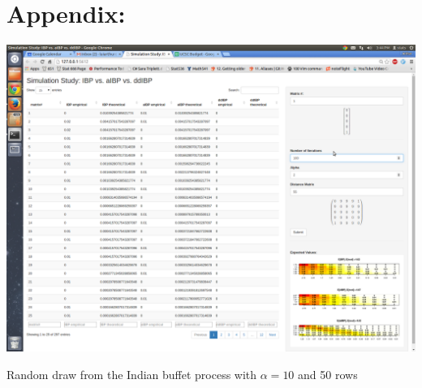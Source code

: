 \chapter{Appendix:}
\beginmyfig
  \vspace{-15mm}
  \vspace{-10mm}
  \includegraphics{images/shiny.png}
  \caption{Random draw from the Indian buffet process with $\alpha=10$ and 50 rows}
  \vspace{-13mm}
\endmyfig

